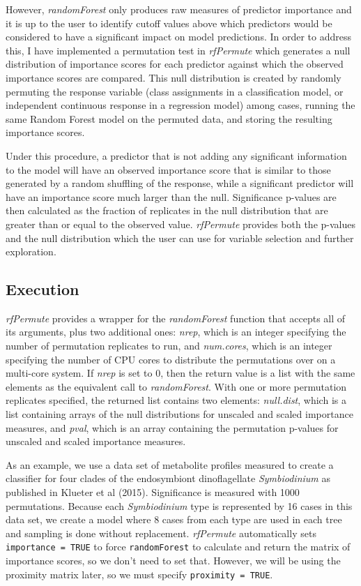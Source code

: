 However, \emph{randomForest} only produces raw measures of predictor
importance and it is up to the user to identify cutoff values above
which predictors would be considered to have a significant impact on
model predictions. In order to address this, I have implemented a
permutation test in \emph{rfPermute} which generates a null distribution
of importance scores for each predictor against which the observed
importance scores are compared. This null distribution is created by
randomly permuting the response variable (class assignments in a
classification model, or independent continuous response in a regression
model) among cases, running the same Random Forest model on the permuted
data, and storing the resulting importance scores.

Under this procedure, a predictor that is not adding any significant
information to the model will have an observed importance score that is
similar to those generated by a random shuffling of the response, while
a significant predictor will have an importance score much larger than
the null. Significance p-values are then calculated as the fraction of
replicates in the null distribution that are greater than or equal to
the observed value. \emph{rfPermute} provides both the p-values and the
null distribution which the user can use for variable selection and
further exploration.

\subsection{Execution}\label{execution}

\emph{rfPermute} provides a wrapper for the \emph{randomForest} function
that accepts all of its arguments, plus two additional ones:
\emph{nrep}, which is an integer specifying the number of permutation
replicates to run, and \emph{num.cores}, which is an integer specifying
the number of CPU cores to distribute the permutations over on a
multi-core system. If \emph{nrep} is set to 0, then the return value is
a list with the same elements as the equivalent call to
\emph{randomForest}. With one or more permutation replicates specified,
the returned list contains two elements: \emph{null.dist}, which is a
list containing arrays of the null distributions for unscaled and scaled
importance measures, and \emph{pval}, which is an array containing the
permutation p-values for unscaled and scaled importance measures.

As an example, we use a data set of metabolite profiles measured to
create a classifier for four clades of the endosymbiont dinoflagellate
\emph{Symbiodinium} as published in Klueter et al (2015). Significance
is measured with 1000 permutations. Because each \emph{Symbiodinium}
type is represented by 16 cases in this data set, we create a model
where 8 cases from each type are used in each tree and sampling is done
without replacement. \emph{rfPermute} automatically sets
\texttt{importance\ =\ TRUE} to force \texttt{randomForest} to calculate
and return the matrix of importance scores, so we don't need to set
that. However, we will be using the proximity matrix later, so we must
specify \texttt{proximity\ =\ TRUE}.

